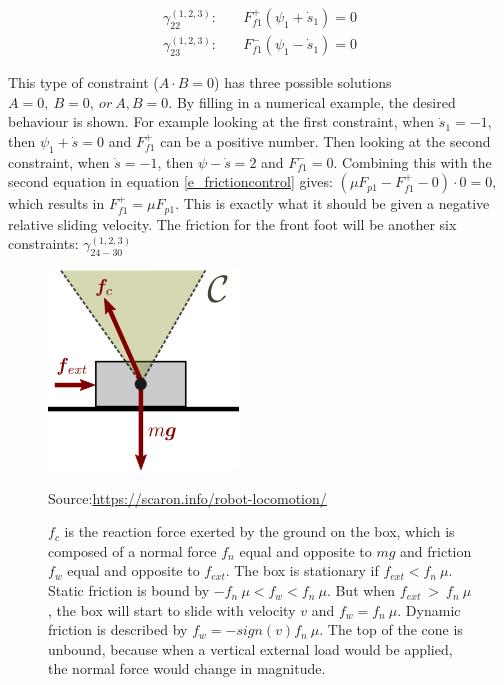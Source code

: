 \documentclass[default,iicol]{sn-jnl}
\theoremstyle{thmstyleone}%
\theoremstyle{thmstyletwo}%
\theoremstyle{thmstylethree}%
\begin{document}
\begin{equation}
\begin{split}
    \gamma_{22}^{(1,2,3)}: \quad & F_{f1}^+ (\psi_1 + \dot s_1)  = 0 \\
    \gamma_{23}^{(1,2,3)}: \quad & F_{f1}^- (\psi_1 - \dot s_1)  = 0
\end{split}
\end{equation}

This type of constraint ($A\cdot B = 0$) has three possible solutions $A= 0,\ B=0,\ or\ A,B = 0$. By filling in a numerical example, the desired behaviour is shown. For example looking at the first constraint, when $\dot s_1 = -1$, then $\psi_1 + \dot s =  0$ and $F_{f1}^+$ can be a positive number. Then looking at the second constraint, when $\dot s = -1$, then $\psi - \dot s = 2$ and $F_{f1}^- = 0$. Combining this with the second equation in equation \ref{e_frictioncontrol} gives: $(\mu F_{p1} - F_{f1}^+ - 0) \cdot 0 = 0$, which results in $F_{f1}^+ = \mu F_{p1}$. This is exactly what it should be given a negative relative sliding velocity. 
The friction for the front foot will be another six constraints: $\gamma_{24-30}^{(1,2,3)}$ 

\begin{figure}
    \centering
    \includegraphics{figure/Frictioncone.png}
    \caption[friction cone]{$f_c$ is the reaction force exerted by the ground on the box, which is composed of a normal force $f_n$ equal and opposite to $mg$ and friction $f_w$ equal and opposite to $f_{ext}$. The box is stationary if $f_{ext} < f_n\ \mu$. Static friction is bound by $-f_n\ \mu < f_w < f_n\ \mu$. But when $f_{ext}\ >\ f_n\ \mu$, the box will start to slide with velocity $v$ and $f_w = f_n\ \mu$. Dynamic friction is described by $f_w = -sign(v) f_n\ \mu$. The top of the cone is unbound, because when a vertical external load would be applied, the normal force would change in magnitude.} 
    \footnotesize Source:\url{https://scaron.info/robot-locomotion/}
    \label{f_frictioncone}
\end{figure}
\end{document}
